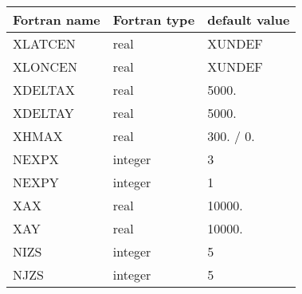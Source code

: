\begin{center}
\begin{tabular} {|l|l|l|}
\hline
Fortran name & Fortran type & default value \\
\hline
XLATCEN   & real & XUNDEF    \\
XLONCEN   & real & XUNDEF     \\
XDELTAX   & real & 5000.  \\
XDELTAY   & real & 5000.  \\
XHMAX     & real &  300. / 0.  \\
NEXPX     & integer&  3      \\
NEXPY     & integer&  1      \\
XAX       & real &  10000.   \\
XAY       & real &  10000.   \\
NIZS      & integer & 5    \\
NJZS      & integer & 5  \\
\hline
\end{tabular}
\end{center}


